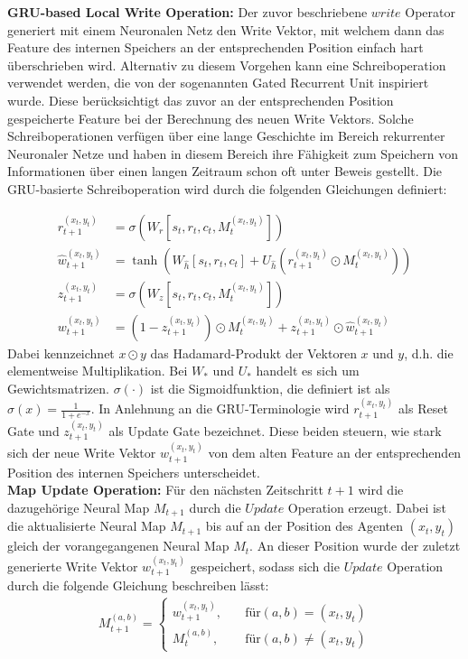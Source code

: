 \textbf{GRU-based Local Write Operation:} Der zuvor beschriebene $write$ Operator generiert mit einem Neuronalen Netz den Write Vektor, mit welchem dann das Feature des internen Speichers an der entsprechenden Position einfach hart überschrieben wird. Alternativ zu diesem Vorgehen kann eine Schreiboperation verwendet werden, die von der sogenannten Gated Recurrent Unit inspiriert wurde. Diese berücksichtigt das zuvor an der entsprechenden Position gespeicherte Feature bei der Berechnung des neuen Write Vektors. Solche Schreiboperationen verfügen über eine lange Geschichte im Bereich rekurrenter Neuronaler Netze und haben in diesem Bereich ihre Fähigkeit zum Speichern von Informationen über einen langen Zeitraum schon oft unter Beweis gestellt. Die GRU-basierte Schreiboperation wird durch die folgenden Gleichungen definiert:

\begin{equation*}
  \begin{align*}
    r_{t+1}^{(x_t,y_t)} &= \sigma(W_r[s_t, r_t, c_t, M_t^{(x_t,y_t)}]) \\
    \hat{w}_{t+1}^{(x_t,y_t)} &= \tanh (W_{\hat{h}}[s_t, r_t, c_t] + U_{\hat{h}}(r_{t+1}^{(x_t,y_t)} \odot M_t^{(x_t,y_t)})) \\
    z_{t+1}^{(x_t,y_t)} & = \sigma(W_z[s_t, r_t, c_t, M_t^{(x_t,y_t)}]) \\
    w_{t+1}^{(x_t,y_t)} &= (1 - z_{t+1}^{(x_t,y_t)}) \odot M_t^{(x_t,y_t)} + z_{t+1}^{(x_t,y_t)} \odot \hat{w}_{t+1}^{(x_t,y_t)}
  \end{align*}
\end{equation*}
Dabei kennzeichnet $x \odot y$ das Hadamard-Produkt der Vektoren $x$ und $y$, d.h. die elementweise Multiplikation. Bei $W_*$ und $U_*$ handelt es sich um Gewichtsmatrizen. $\sigma(\cdot)$ ist die Sigmoidfunktion, die definiert ist als $\sigma(x) = \frac{1}{1+e^{-x}}$. In Anlehnung an die GRU-Terminologie wird $r_{t+1}^{(x_t,y_t)}$ als Reset Gate und $z_{t+1}^{(x_t,y_t)}$ als Update Gate bezeichnet. Diese beiden steuern, wie stark sich der neue Write Vektor $w_{t+1}^{(x_t,y_t)}$ von dem alten Feature an der entsprechenden Position des internen Speichers unterscheidet.\\[0.1in]
\textbf{Map Update Operation:} Für den nächsten Zeitschritt $t+1$ wird die dazugehörige Neural Map $M_{t+1}$ durch die $Update$ Operation erzeugt. Dabei ist die aktualisierte Neural Map $M_{t+1}$ bis auf an der Position des Agenten $(x_t,y_t)$ gleich der vorangegangenen Neural Map $M_t$. An dieser Position wurde der zuletzt generierte Write Vektor $w_{t+1}^{(x_t,y_t)}$ gespeichert, sodass sich die $Update$ Operation durch die folgende Gleichung beschreiben lässt:
\begin{equation*}
  \begin{align*}
    M_{t+1}^{(a,b)} =
    \begin{cases}
      w_{t+1}^{(x_t,y_t)}, & \quad \text{für} (a,b) = (x_t,y_t) \\
      M_t^{(a,b)}, & \quad \text{für} (a,b) \ne (x_t,y_t)
    \end{cases}
  \end{align*}
\end{equation*}

